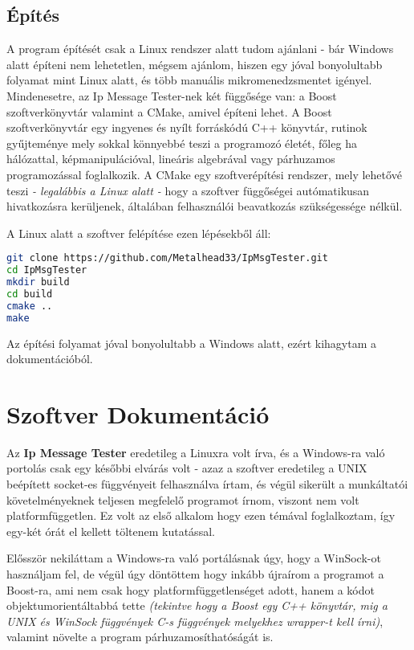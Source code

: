 \documentclass[openany,10pt,a4paper]{book}
\begin{document}
\subsection{Építés}
A program építését csak a Linux rendszer alatt tudom ajánlani - bár Windows alatt építeni nem lehetetlen, mégsem ajánlom, hiszen egy jóval bonyolultabb folyamat mint Linux alatt, és több manuális mikromenedzsmentet igényel. Mindenesetre, az Ip Message Tester-nek két függősége van: a Boost szoftverkönyvtár valamint a CMake, amivel építeni lehet. A Boost szoftverkönyvtár egy ingyenes és nyílt forráskódú C++ könyvtár, rutinok gyűjteménye mely sokkal könnyebbé teszi a programozó életét, főleg ha hálózattal, képmanipulációval, lineáris algebrával vagy párhuzamos programozással foglalkozik. A CMake egy szoftverépítési rendszer, mely lehetővé teszi \textit{- legalábbis a Linux alatt -} hogy a szoftver függőségei autómatikusan hivatkozásra kerüljenek, általában felhasználói beavatkozás szükségessége nélkül.

A Linux alatt a szoftver felépítése ezen lépésekből áll:

\begin{lstlisting}[language=bash]
git clone https://github.com/Metalhead33/IpMsgTester.git
cd IpMsgTester
mkdir build
cd build
cmake ..
make
\end{lstlisting}

Az építési folyamat jóval bonyolultabb a Windows alatt, ezért kihagytam a dokumentációból.
\section{Szoftver Dokumentáció}
Az \textbf{Ip Message Tester} eredetileg a Linuxra volt írva, és a Windows-ra való portolás csak egy későbbi elvárás volt - azaz a szoftver eredetileg a UNIX beépített socket-es függvényeit felhasználva írtam, és végül sikerült a munkáltatói követelményeknek teljesen megfelelő programot írnom, viszont nem volt platformfüggetlen. Ez volt az első alkalom hogy ezen témával foglalkoztam, így egy-két órát el kellett töltenem kutatással. 

Elősször nekiláttam a Windows-ra való portálásnak úgy, hogy a WinSock-ot használjam fel, de végül úgy döntöttem hogy inkább újraírom a programot a Boost-ra, ami nem csak hogy platformfüggetlenséget adott, hanem a kódot objektumorientáltabbá tette \textit{(tekintve hogy a Boost egy C++ könyvtár, mig a UNIX és WinSock függvények C-s függvények melyekhez wrapper-t kell írni)}, valamint növelte a program párhuzamosíthatóságát is.
\end{document}

